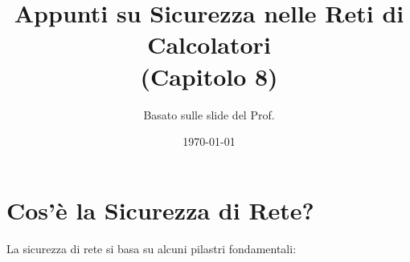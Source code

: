 


\title{Appunti su Sicurezza nelle Reti di Calcolatori \\ (Capitolo 8)}
\author{Basato sulle slide del Prof.} %
\date{\today}


\maketitle
\tableofcontents
\newpage

\section{Cos'è la Sicurezza di Rete?}
\label{sec:cos_e_sicurezza}

La sicurezza di rete si basa su alcuni pilastri fondamentali:

